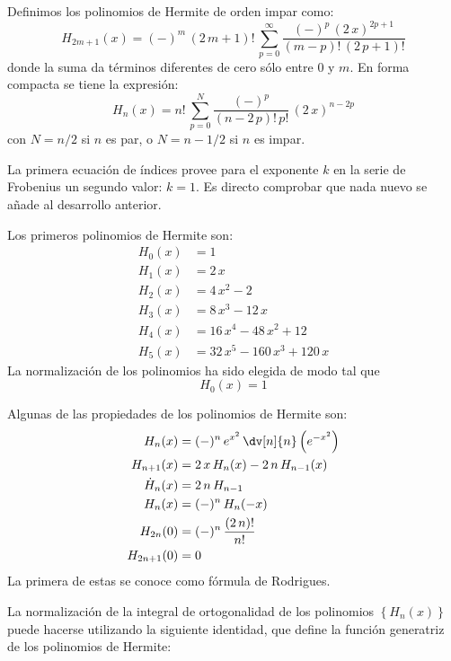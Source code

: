 Definimos los polinomios de Hermite de orden impar como:
\begin{equation}
H_{2m+1} (x) = (-)^{m} \, (2 \, m + 1)! \, \sum_{p=0}^{\infty} \dfrac{(-)^{p} \, (2 \, x)^{2p+1}}{(m-p)! \, (2 \, p + 1)!}
\label{eq:ecuacion_08_61}
\end{equation}
donde la suma da términos diferentes de cero sólo entre $0$ y $m$. En forma compacta se tiene la expresión:
\begin{equation}
\boxed{H_{n}(x) = n! \, \sum_{p=0}^{N} \dfrac{(-)^{p}}{(n - 2 \, p)! \, p!} \, (2 \, x)^{n-2p}}
\label{eq:ecuacion_08_62}
\end{equation}
con $N=n/2$ si $n$ es par, o $N=n-1/2$ si $n$ es impar.
\par
La primera ecuación de índices provee para el exponente $k$ en la serie de Frobenius un segundo valor: $k = 1$. Es directo comprobar que nada nuevo se añade al desarrollo anterior.
\par
Los primeros polinomios de Hermite son:
\begin{align*}
H_{0}(x) &= 1 \\
H_{1}(x) &= 2 \, x \\
H_{2}(x) &= 4 \, x^{2} - 2 \\
H_{3}(x) &= 8 \, x^{3} - 12 \, x \\
H_{4}(x) &= 16 \, x^{4} - 48 \, x^{2} + 12 \\
H_{5}(x) &= 32 \, x^{5} - 160 \, x^{3} + 120 \, x
\end{align*}
La normalización de los polinomios ha sido elegida de modo tal que 
\[H_{0}(x) = 1 \]
\par
Algunas de las propiedades de los polinomios de Hermite son:
\begin{align*}
H_{n} (x) &= (-)^{n} \, e^{x^{2}} \, \dv[n]{n} \left( e^{-x^{2}} \right) \\
H_{n+1} (x) &= 2 \, x \, H_{n} (x) - 2 \, n \, H_{n-1} (x) \\
\dot{H}_{n} (x) &= 2 \, n \, H_{n-1} \\
H_{n} (x) &= (-)^{n} \, H_{n} (-x) \\
H_{2n} (0) &= (-)^{n} \, \dfrac{(2 \, n)!}{n!} \\
H_{2n+1} (0) &= 0
\end{align*}
La primera de estas se conoce como fórmula de Rodrigues.
\par
La normalización de la integral de ortogonalidad de los polinomios $\left\{ H_{n} (x) \right\}$ puede hacerse utilizando la siguiente identidad, que define la función generatriz de los polinomios de Hermite:

